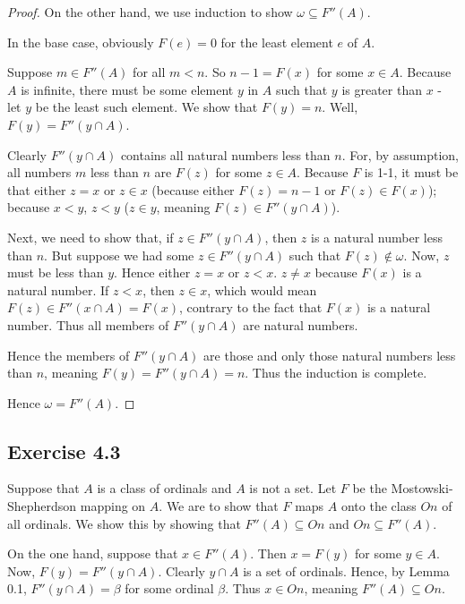 \documentclass{article}
\theoremstyle{definition}
\begin{document}
\begin{proof}

On the other hand, we use induction to show $\omega\subseteq F''(A)$. 

In the base case, obviously $F(e)=0$ for the least element $e$ of $A$. 

Suppose $m\in F''(A)$ for all $m<n$. So 
$n-1=F(x)$ for some $x\in A$. Because $A$ is infinite, there must be some element $y$ in $A$ such that 
$y$ is greater than $x$ - let $y$ be the least such element. We show that 
$F(y)=n$. Well, $F(y)=F''(y\cap A)$. 

Clearly $F''(y\cap A)$ contains all natural numbers less than 
$n$. For, by assumption, all numbers $m$ less than $n$ are $F(z)$ for some $z\in A$. Because $F$ is 1-1, 
it must be that either $z=x$ or $z\in x$ (because either $F(z)=n-1$ or $F(z)\in F(x)$); 
because $x<y$, $z<y$ ($z\in y$, meaning $F(z)\in F''(y\cap A)$).

Next, we need to show that, if $z\in F''(y\cap A)$, then $z$ is a natural number less than $n$. But suppose we had 
some $z\in F''(y\cap A)$ such that $F(z)\notin\omega$. Now, $z$ must be less than $y$. Hence either 
$z=x$ or $z<x$. $z\ne x$ because $F(x)$ is a natural number. If $z<x$, then $z\in x$, which would mean 
$F(z)\in F''(x\cap A)=F(x)$, contrary to the fact that $F(x)$ is a natural number. Thus all members of 
$F''(y\cap A)$ are natural numbers.

Hence the members of $F''(y\cap A)$ are those and only those natural numbers less than $n$, meaning 
$F(y)=F''(y\cap A)=n$. Thus the induction is complete. 

Hence $\omega=F''(A)$.

\end{proof}

\subsection*{Exercise 4.3}
Suppose that $A$ is a class of ordinals and $A$ is not a set. Let $F$ be the Mostowski-Shepherdson mapping on $A$. We are to show that 
$F$ maps $A$ onto the class $On$ of all ordinals. We show this by showing that $F''(A)\subseteq On$ and $On\subseteq F''(A)$.

On the one hand, suppose that $x\in F''(A)$. Then $x=F(y)$ for some $y\in A$. Now, $F(y)=F''(y\cap A)$. Clearly 
$y\cap A$ is a set of ordinals. Hence, by Lemma 0.1, $F''(y\cap A)=\beta$ for some ordinal $\beta$. Thus 
$x\in On$, meaning $F''(A)\subseteq On$.
\end{document}
